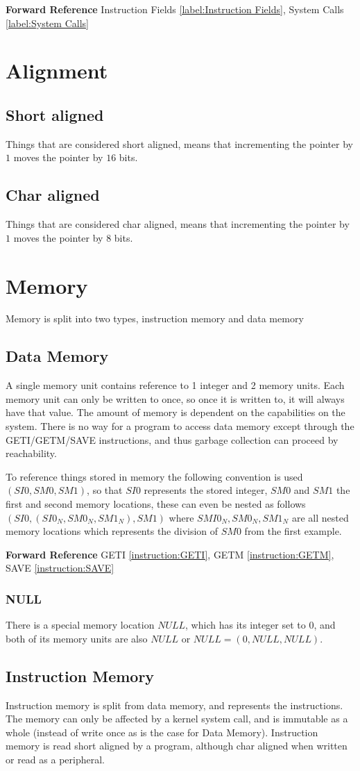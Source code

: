 \documentclass[12pt,letterpaper]{report}
\newcommand{\mem}[3]{\left(#1, #2, #3\right)}
\newcommand{\nil}{NULL}
\newcommand{\SEE}{\textbf{Forward Reference} }
\newcommand{\fref}[2]{#2 \ref{#1:#2}}
\begin{document}
\SEE \fref{label}{Instruction Fields}, \fref{label}{System Calls}
\section{Alignment}
\subsection{Short aligned}
Things that are considered short aligned, means that incrementing the pointer by $1$ moves the pointer by $16$ bits.
\subsection{Char aligned}
Things that are considered char aligned, means that incrementing the pointer by $1$ moves the pointer by $8$ bits.
\section{Memory}
Memory is split into two types, instruction memory and data memory
\subsection{Data Memory}
A single memory unit contains reference to 1 integer and 2 memory units. Each memory unit can only be written to once, so once it is written to, it will always have that value. The amount of memory is dependent on the capabilities on the system. There is no way for a program to access data memory except through the GETI/GETM/SAVE instructions, and thus garbage collection can proceed by reachability.

To reference things stored in memory the following convention is used $\mem{SI0}{SM0}{SM1}$, so that $SI0$ represents the stored integer, $SM0$ and $SM1$ the first and second memory locations, these can even be nested as follows $\mem{SI0}{\mem{SI0_N}{SM0_N}{SM1_N}}{SM1}$ where $SMI0_N, SM0_N, SM1_N$ are all nested memory locations which represents the division of $SM0$ from the first example.

\SEE \fref{instruction}{GETI}, \fref{instruction}{GETM}, \fref{instruction}{SAVE}
\subsubsection{NULL}
There is a special memory location $\nil$, which has its integer set to $0$, and both of its memory units are also $\nil$ or $\nil = \mem{0}{\nil}{\nil}$.
\subsection{Instruction Memory}
Instruction memory is split from data memory, and represents the instructions. The memory can only be affected by a kernel system call, and is immutable as a whole (instead of write once as is the case for Data Memory). Instruction memory is read short aligned by a program, although char aligned when written or read as a peripheral.
\end{document}

